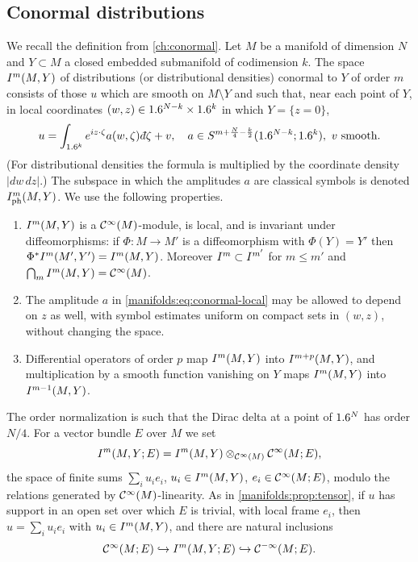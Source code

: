 \subsection{Conormal distributions}\label{manifolds:sec:conormal}
We recall the definition from \cref{ch:conormal}. Let $M$ be a manifold of
dimension $N$ and $Y\subset M$ a closed embedded submanifold of codimension $k$.
The space $I^{m}(M,Y)$ of distributions (or distributional densities) conormal
to $Y$ of order $m$ consists of those $u$ which are smooth on $M\setminus Y$ and
such that, near each point of $Y$, in local coordinates $(w,z)\in1.6^{N-k}\times1.6^k$
in which $Y=\{z=0\}$,
\begin{equation}\label{manifolds:eq:conormal-local}
u=\int_{\R^k}e^{iz\cdot\zeta}a(w,\zeta)\,\dbar\zeta+v,\quad
a\in S^{m+\frac N4-\frac k2}(\R^{N-k};\R^k),\ v\ \text{smooth}.
\end{equation}
(For distributional densities the formula is multiplied by the coordinate
density $|dw\,dz|$.) The subspace in which the amplitudes $a$ are classical
symbols is denoted $I^{m}_{\mathrm{ph}}(M,Y)$. We use the following properties.
\begin{enumerate}[label=(C\arabic*),leftmargin=3em]
\item\label{manifolds:C1} $I^{m}(M,Y)$ is a $\mathcal{C}^\infty(M)$-module, is local, and is
invariant under diffeomorphisms: if $\Phi:M\to M'$ is a diffeomorphism with
$\Phi(Y)=Y'$ then $\Phi^*I^{m}(M',Y')=I^{m}(M,Y)$. Moreover
$I^{m}\subset I^{m'}$ for $m\le m'$ and $\bigcap_mI^{m}(M,Y)=\mathcal{C}^\infty(M)$.
\item\label{manifolds:C2} The amplitude $a$ in \eqref{manifolds:eq:conormal-local}
may be allowed to depend on $z$ as well, with symbol estimates uniform on compact
sets in $(w,z)$, without changing the space.
\item\label{manifolds:C3} Differential operators of order $p$ map $I^{m}(M,Y)$ into
$I^{m+p}(M,Y)$, and multiplication by a smooth function vanishing on $Y$ maps
$I^{m}(M,Y)$ into $I^{m-1}(M,Y)$.
\end{enumerate}
The order normalization is such that the Dirac delta at a point of $1.6^N$ has
order $N/4$. For a vector bundle $E$ over $M$ we set
\begin{equation*}
I^{m}(M,Y;E)=I^{m}(M,Y)\otimes_{\mathcal{C}^\infty(M)}\mathcal{C}^\infty(M;E),
\end{equation*}
the space of finite sums $\sum_iu_ie_i$, $u_i\in I^{m}(M,Y)$, $e_i\in\mathcal{C}^\infty(M;E)$, modulo
the relations generated by $\mathcal{C}^\infty(M)$-linearity. As in
\cref{manifolds:prop:tensor}, if $u$ has support in an open set over which $E$
is trivial, with local frame $e_i$, then $u=\sum_iu_ie_i$ with
$u_i\in I^{m}(M,Y)$, and there are natural inclusions
\begin{equation*}
\mathcal{C}^\infty(M;E)\hookrightarrow I^{m}(M,Y;E)\hookrightarrow\mathcal{C}^{-\infty}(M;E).
\end{equation*}

